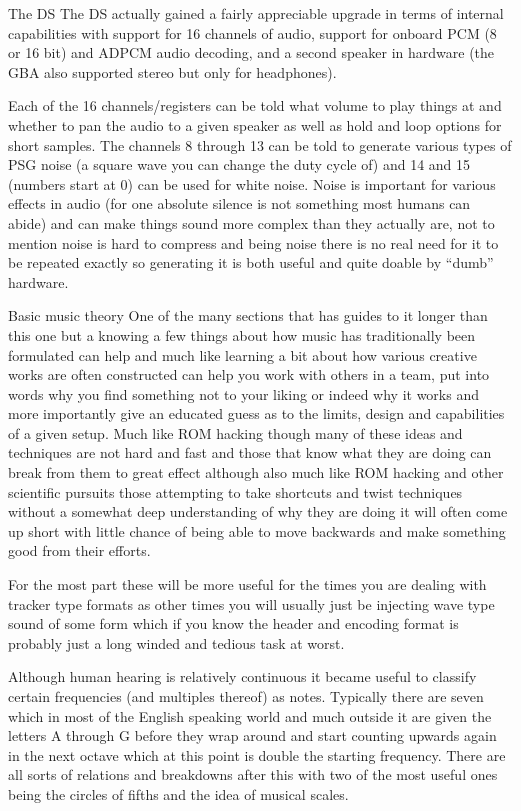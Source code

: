 \documentclass[
]{book}
\begin{document}
The DS The DS actually gained a fairly appreciable upgrade in terms of internal capabilities with support for 16 channels of audio, support for onboard PCM (8 or 16 bit) and ADPCM audio decoding, and a second speaker in hardware (the GBA also supported stereo but only for headphones).

Each of the 16 channels/registers can be told what volume to play things at and whether to pan the audio to a given speaker as well as hold and loop options for short samples. The channels 8 through 13 can be told to generate various types of PSG noise (a square wave you can change the duty cycle of) and 14 and 15 (numbers start at 0) can be used for white noise. Noise is important for various effects in audio (for one absolute silence is not something most humans can abide) and can make things sound more complex than they actually are, not to mention noise is hard to compress and being noise there is no real need for it to be repeated exactly so generating it is both useful and quite doable by ``dumb'' hardware.

Basic music theory One of the many sections that has guides to it longer than this one but a knowing a few things about how music has traditionally been formulated can help and much like learning a bit about how various creative works are often constructed can help you work with others in a team, put into words why you find something not to your liking or indeed why it works and more importantly give an educated guess as to the limits, design and capabilities of a given setup. Much like ROM hacking though many of these ideas and techniques are not hard and fast and those that know what they are doing can break from them to great effect although also much like ROM hacking and other scientific pursuits those attempting to take shortcuts and twist techniques without a somewhat deep understanding of why they are doing it will often come up short with little chance of being able to move backwards and make something good from their efforts.

For the most part these will be more useful for the times you are dealing with tracker type formats as other times you will usually just be injecting wave type sound of some form which if you know the header and encoding format is probably just a long winded and tedious task at worst.

Although human hearing is relatively continuous it became useful to classify certain frequencies (and multiples thereof) as notes. Typically there are seven which in most of the English speaking world and much outside it are given the letters A through G before they wrap around and start counting upwards again in the next octave which at this point is double the starting frequency. There are all sorts of relations and breakdowns after this with two of the most useful ones being the circles of fifths and the idea of musical scales.
\end{document}
